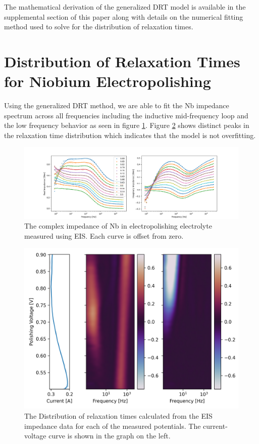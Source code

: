 \documentclass[11pt]{article}
\begin{document}
The mathematical derivation of the generalized DRT model is available in the supplemental section of this paper along with details on the numerical fitting method used to solve for the distribution of relaxation times.



\section{Distribution of Relaxation Times for Niobium Electropolishing}

Using the generalized DRT method, we are able to fit the Nb impedance spectrum across all frequencies including the inductive mid-frequency loop and the low frequency behavior as seen in figure \ref{fig:bodeplot}. Figure \ref{fig:gamma} shows distinct peaks in the relaxation time distribution which indicates that the model is not overfitting.

\begin{figure}[t]
  \label{fig:bodeplot}
  \includegraphics[width=\textwidth]{../figures/bodeplot.png}
  \caption{The complex impedance of Nb in electropolishing electrolyte measured using EIS. Each curve is offset from zero.}
\end{figure}

\begin{figure}[t]
  \label{fig:gamma}
  \includegraphics[width=\textwidth]{../figures/gamma.png}  
  \caption{The Distribution of relaxation times calculated from the EIS impedance data for each of the measured potentials. The current-voltage curve is shown in the graph on the left.}
\end{figure}
\end{document}
